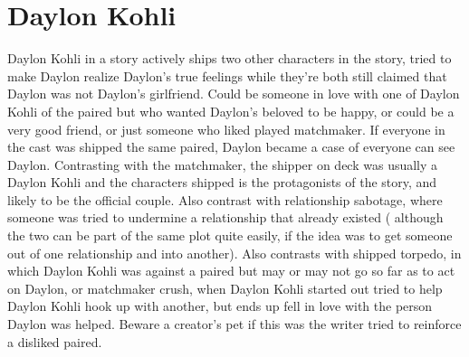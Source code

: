 \documentclass[12pt]{book}
\begin{document}
\chapter{Daylon Kohli}

Daylon Kohli in a story actively ships two other characters in the story, tried to make Daylon realize Daylon's true feelings while they're both still claimed that Daylon was not Daylon's girlfriend. Could be someone in love with one of Daylon Kohli of the paired but who wanted Daylon's beloved to be happy, or could be a very good friend, or just someone who liked played matchmaker. If everyone in the cast was shipped the same paired, Daylon became a case of everyone can see Daylon. Contrasting with the matchmaker, the shipper on deck was usually a Daylon Kohli and the characters shipped is the protagonists of the story, and likely to be the official couple. Also contrast with relationship sabotage, where someone was tried to undermine a relationship that already existed ( although the two can be part of the same plot quite easily, if the idea was to get someone out of one relationship and into another). Also contrasts with shipped torpedo, in which Daylon Kohli was against a paired but may or may not go so far as to act on Daylon, or matchmaker crush, when Daylon Kohli started out tried to help Daylon Kohli hook up with another, but ends up fell in love with the person Daylon was helped. Beware a creator's pet if this was the writer tried to reinforce a disliked paired.
\end{document}
